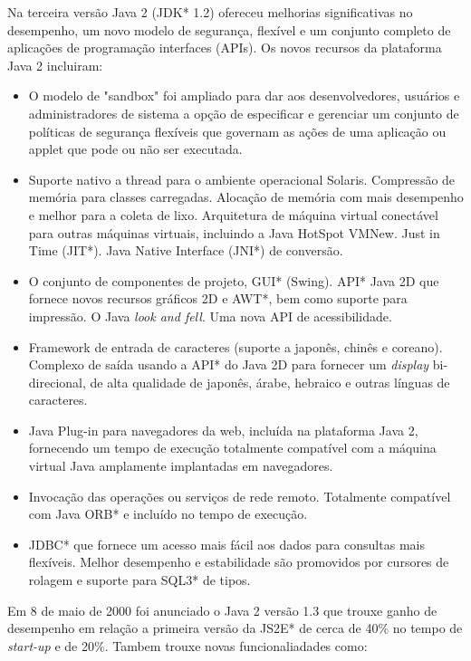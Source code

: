 Na terceira versão Java 2 (JDK* 1.2) ofereceu melhorias significativas no desempenho, um novo modelo de segurança, flexível e um conjunto completo de aplicações de programação interfaces (APIs). Os novos recursos da plataforma Java 2 incluiram: 
\begin{itemize}
  \item O modelo de "sandbox"  foi ampliado para dar aos desenvolvedores, usuários e administradores de sistema a opção de especificar e gerenciar um conjunto de políticas de segurança flexíveis que governam as ações de uma aplicação ou applet que pode ou não ser executada.
  \item Suporte nativo a thread para o ambiente operacional Solaris. Compressão de memória para classes carregadas. Alocação de memória com mais desempenho e melhor para a coleta de lixo. Arquitetura de máquina virtual conectável para outras máquinas virtuais, incluindo a Java HotSpot VMNew. Just in Time (JIT*). Java Native Interface (JNI*) de conversão.
  \item O conjunto de componentes de projeto, GUI* (Swing). API* Java 2D que fornece novos recursos gráficos 2D e AWT*, bem como suporte para impressão. O Java {\it look and fell}. Uma nova API de acessibilidade.
  \item Framework de entrada de caracteres (suporte a japonês, chinês e coreano). Complexo de saída usando a API* do Java 2D para fornecer um {\it display} bi-direcional, de alta qualidade de japonês, árabe, hebraico e outras línguas de caracteres.
  \item Java Plug-in para navegadores da web, incluída na plataforma Java 2, fornecendo um tempo de execução totalmente compatível com a máquina virtual Java amplamente implantadas em navegadores.
  \item Invocação das operações ou serviços de rede remoto. Totalmente compatível com Java ORB* e incluído no tempo de execução.
  \item JDBC* que fornece um acesso mais fácil aos dados para consultas mais flexíveis. Melhor desempenho e estabilidade são promovidos por cursores de rolagem e suporte para SQL3* de tipos.\\
\end{itemize}

Em 8 de maio de 2000 foi anunciado o Java 2 versão 1.3 que trouxe ganho de desempenho em relação a primeira versão da JS2E* de cerca de 40\%  no tempo de {\it  start-up} e de 20\%. Tambem trouxe novas funcionaliadades como: 

